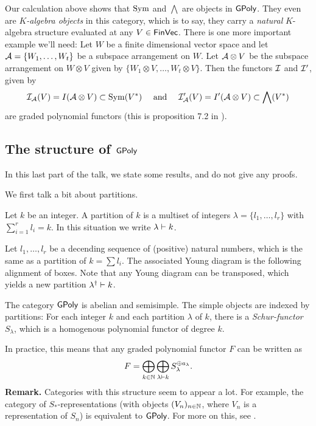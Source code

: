 \documentclass[../main.tex]{subfiles}
\begin{document}
Our calculation above shows that $\operatorname{Sym}$ and $\bigwedge$ are objects in $\textnormal{$\textsf{GPoly}$}$. 
They even are \emph{$K$-algebra objects} in this category, which is to say, they 
carry a \emph{natural} $K$-algebra structure evaluated at any $V \in \textnormal{$\textsf{FinVec}$}$.
There is one more important example we'll need: Let $W$ be a finite dimensional vector
space and let $\mathcal{A} = \{W_1,\dots, W_t\}$ be a subspace arrangement on $W$. Let
$\mathcal{A} \otimes V$ be the subspace arrangement on $W \otimes V$ given by 
$\{W_1 \otimes V, \dots, W_t \otimes V\}$. Then the functors $\mathcal{I}$ and $\mathcal{I}'$, given by
\begin{equation*}
    \mathcal{I}_{\mathcal{A}}(V) = I(\mathcal{A} \otimes V) \subset \operatorname{Sym}(V^*) \quad \text{ and } \quad
    \mathcal{I}'_{\mathcal{A}}(V) = I'(\mathcal{A} \otimes V) \subset \bigwedge(V^*)
\end{equation*}
are graded polynomial functors (this is proposition 7.2 in 
\cite{Gandini2019ResOfIdeals}). 

\subsection{The structure of $\textnormal{$\textsf{GPoly}$}$}
In this last part of the talk, we state some results, and do not give any proofs.

We first talk a bit about partitions.
\begin{defi}[Partition]
    Let $k$ be an integer. A partition of $k$ is a multiset of integers
    $\lambda = \{l_1, \dots, l_r\}$ with $\sum_{i = 1}^r l_i = k$. In this 
    situation we write $\lambda \vdash k$.
\end{defi}
\begin{defi}
    Let $l_1, \dots, l_r$ be a decending sequence of (positive) natural numbers,
    which is the same as a partition of $k = \sum l_i$. The associated Young diagram
    is the following alignment of boxes.
    Note that any Young diagram can be transposed, which yields a new partition
    $\lambda^\dagger \vdash k$.
\end{defi}


\begin{thm}
    The category $\textnormal{$\textsf{GPoly}$}$ is abelian and semisimple. The simple objects are indexed
    by partitions: For each integer $k$ and each partition $\lambda$ of $k$, there 
    is a \emph{Schur-functor} $S_\lambda$, which is a homogenous polynomial functor
    of degree $k$.
\end{thm}
In practice, this means that any graded polynomial functor $F$ can be written as
\begin{equation*}
    F = \bigoplus_{k \in \mathbb{N}} \bigoplus_{\lambda \vdash k} S_\lambda^{\oplus a_\lambda}.
\end{equation*}
\textbf{Remark.} Categories with this structure seem to appear a lot. For
example, the category of $S_*$-representations (with objects $(V_n)_{n \in \mathbb{N}}$, where
$V_n$ is a representation of $S_n$) is equivalent to $\textnormal{$\textsf{GPoly}$}$. For more on this,
see \cite{sam2012introduction}.
\end{document}
